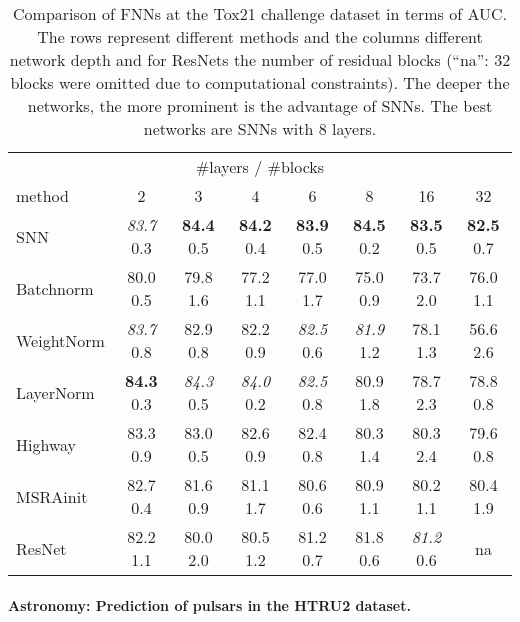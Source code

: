 \documentclass{article}
\begin{document}
\begin{table}[ht]
\caption[Comparison of FNNs at the Tox21 challenge dataset]{Comparison of FNNs at the Tox21 challenge dataset
in terms of AUC. The rows  represent different methods and the columns 
different network depth and for ResNets  the number of residual blocks 
(``na'': 32 blocks were omitted due to computational constraints).
The deeper the networks, the more prominent is the advantage of SNNs.
The best networks are SNNs with 8 layers. 
 \label{tab:tox21}}
\centering
\begin{tabular}{lccccccc}
  \toprule
  \multicolumn{8}{c}{\#layers / \#blocks} \\
  method & 2 & 3 & 4 & 6 & 8 & 16 & 32 \\ 
  \midrule 
  SNN        & {\em 83.7} \tiny  0.3 & {\bf 84.4} \tiny  0.5 & {\bf 84.2} \tiny  0.4 & {\bf 83.9} \tiny  0.5 & {\bf 84.5} \tiny  0.2 & {\bf 83.5} \tiny  0.5 & {\bf 82.5} \tiny  0.7 \\ 
  Batchnorm  & 80.0 \tiny  0.5       & 79.8 \tiny  1.6       & 77.2 \tiny  1.1       & 77.0 \tiny  1.7       & 75.0 \tiny  0.9       & 73.7 \tiny  2.0       & 76.0 \tiny  1.1 \\ 
  WeightNorm & {\em 83.7} \tiny  0.8 & 82.9 \tiny  0.8       & 82.2 \tiny  0.9       & {\em 82.5} \tiny  0.6 & {\em 81.9} \tiny  1.2 & 78.1 \tiny  1.3       & 56.6 \tiny  2.6 \\ 
  LayerNorm  & {\bf 84.3} \tiny  0.3 & {\em 84.3} \tiny  0.5 & {\em 84.0} \tiny  0.2 & {\em 82.5} \tiny  0.8 & 80.9 \tiny  1.8       & 78.7 \tiny  2.3       & 78.8 \tiny  0.8 \\ 
  Highway    & 83.3 \tiny  0.9       & 83.0 \tiny  0.5       & 82.6 \tiny  0.9       & 82.4 \tiny  0.8       & 80.3 \tiny  1.4       & 80.3 \tiny  2.4       & 79.6 \tiny  0.8 \\ 
  MSRAinit     & 82.7 \tiny  0.4       & 81.6 \tiny  0.9       & 81.1 \tiny  1.7       & 80.6 \tiny  0.6       & 80.9 \tiny  1.1       & 80.2 \tiny  1.1       & 80.4 \tiny  1.9 \\ 
  ResNet    & 82.2 \tiny  1.1       & 80.0 \tiny  2.0       & 80.5 \tiny  1.2       &   81.2 \tiny   0.7                       & 81.8 \tiny  0.6       & {\em 81.2} \tiny  0.6 &   na \\ 
   \bottomrule
\end{tabular}
\end{table}


\paragraph{Astronomy: Prediction of pulsars in the HTRU2 dataset.}  
\end{document}
